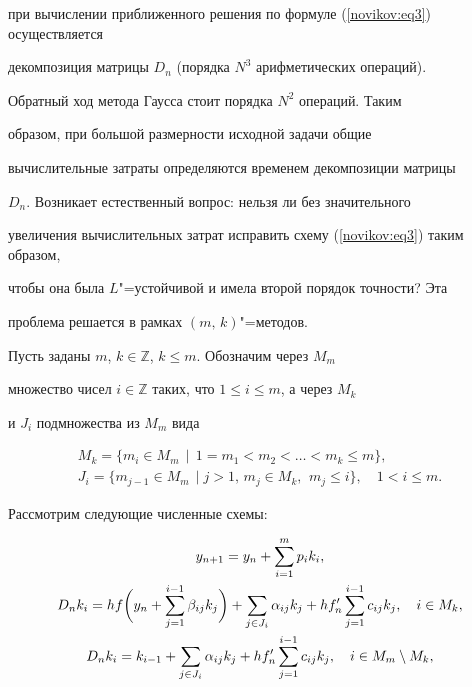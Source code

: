 при вычислении приближенного решения по формуле (\ref{novikov:eq3}) осуществляется

декомпозиция матрицы $D_n$ (порядка $N^3$ арифметических операций).

Обратный ход метода Гаусса стоит порядка $N^2$ операций. Таким

образом, при большой размерности исходной задачи общие

вычислительные затраты определяются временем декомпозиции матрицы

$D_n$. Возникает естественный вопрос: нельзя ли без значительного

увеличения вычислительных затрат исправить схему (\ref{novikov:eq3}) таким образом,

чтобы она была $L$"=устойчивой и имела второй порядок точности? Эта

проблема решается в рамках $(m,\,k)$"=методов.



\smallskip



 Пусть заданы $m$, $k \in \mathbb{Z}$, $k\leq m$. Обозначим через $M_m$

множество чисел $i \in \mathbb{Z}$ таких, что $1 \leq i \leq m$, а через $M_k$

и $J_i$ подмножества из $M_m$ вида

\begin{gather*}

M_k =\{m_i \in M_m\, \mid \, 1=m_1<m_2< \ldots <m_k \leq m\},\\

J_i=\{m_{j-1} \in M_m \, \mid j>1, \,  m_j \in M_k, \,\ m_j\leq i\}, \quad  1<i \leq m.

\end{gather*}

Рассмотрим следующие численные схемы:

\begin{gather}

\notag

y_{n+1}= y_n + \sum_{i=1}^m p_i k_i,\\

\label{novikov:eq4}

D_nk_i=hf \biggl( y_n + \sum_{j=1}^{i-1}\beta_{ij}k_j \biggr) + \sum_{j\in

 J_i} \alpha_{ij}k_j+ hf'_n \sum_{j=1}^{i-1} c_{ij}k_j, \quad

 i\in M_k,\\

\notag

D_nk_i=k_{i-1}+ \sum_{j \in J_i}\alpha_{ij}k_j+

 hf'_n \sum_{j=1}^{i-1}c_{ij}k_j, \quad i\in M_m \setminus M_k,

 \end{gather}

